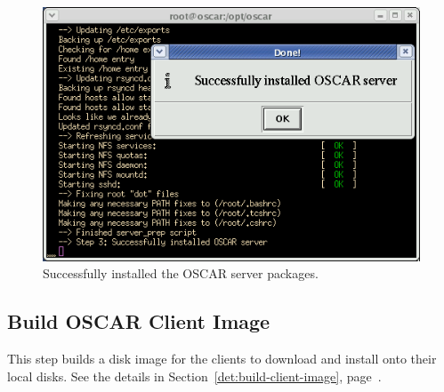 \begin{figure}[hb!]
  \begin{center}
    \includegraphics[scale=\imgscale]{figs/install-server-pkgs-done}
    \caption{Successfully installed the OSCAR server packages.}
    \label{fig:sbs-install-wizard-s1}
  \end{center}
\end{figure}



\subsection{Build OSCAR Client Image}

This step builds a disk image for the clients to download and install
onto their local disks.  See the details in
Section~\ref{det:build-client-image},
page~\pageref{det:build-client-image}.

